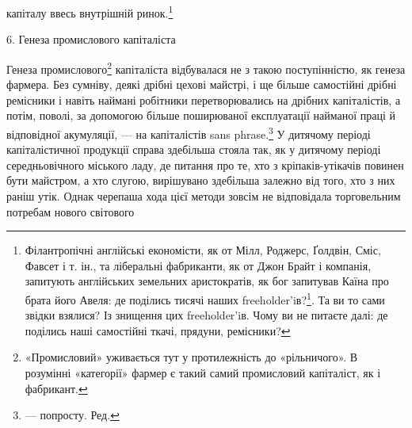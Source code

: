 капіталу ввесь внутрішній ринок.\footnote{
Філантропічні англійські економісти, як от Мілл, Роджерс, Ґолдвін,
Сміс, Фавсет і т. ін., та ліберальні фабриканти, як от Джон Брайт
і компанія, запитують англійських земельних аристократів, як бог
запитував Каїна про брата його Авеля: де поділись тисячі наших freeholder’iв?\footnote*{
— самостійних селян. Ред.
}.
Та ви то сами звідки взялися? Із знищення цих freeholder’iв.
Чому ви не питаєте далі: де поділись наші самостійні ткачі, прядуни,
ремісники?
}

6. Генеза промислового капіталіста

Генеза промислового\footnote{
«Промисловий» уживається тут у протилежність до «рільничого».
В розумінні «категорії» фармер є такий самий промисловий капіталіст,
як і фабрикант.
} капіталіста відбувалася не з такою
поступінністю, як генеза фармера. Без сумніву, деякі дрібні
цехові майстрі, і ще більше самостійні дрібні ремісники і навіть
наймані робітники перетворювались на дрібних капіталістів,
а потім, поволі, за допомогою більше поширюваної експлуатації
найманої праці й відповідної акумуляції, — на капіталістів sans
phrase.\footnote*{
— попросту. Ред.
} У дитячому періоді капіталістичної продукції справа
здебільша стояла так, як у дитячому періоді середньовічного
міського ладу, де питання про те, хто з кріпаків-утікачів повинен
бути майстром, а хто слугою, вирішувано здебільша залежно
від того, хто з них раніш утік. Однак черепаша хода цієї методи
зовсім не відповідала торговельним потребам нового світового
\parbreak{}  %
